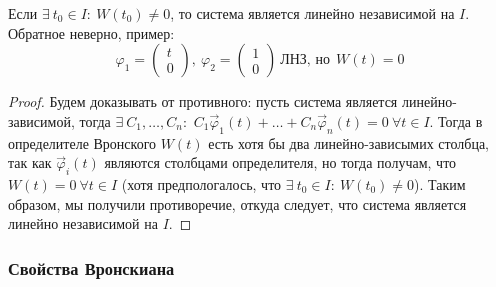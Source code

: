     \begin{theorem}
        Если $\exists ~ t_0 \in I : ~ W(t_0) \neq 0$, то система является линейно независимой на $I$. Обратное неверно,
        пример:
        \begin{equation*}
            \varphi_1 = 
            \begin{pmatrix}
                t \\
                0
            \end{pmatrix}, ~
            \varphi_2 = 
            \begin{pmatrix}
                1 \\
                0
            \end{pmatrix} ~ \text{ЛНЗ, но} ~~ W(t) = 0
        \end{equation*}
    \end{theorem}

    \begin{proof}
        Будем доказывать от противного: пусть система является линейно-зависимой, тогда $\exists ~ C_1, \dots, C_n:$
        $C_1 \vec \varphi_1(t) + \dots + C_n \vec \varphi_n(t) = 0 ~ \forall t \in I$. Тогда в определителе Вронского $W(t)$
        есть хотя бы два линейно-зависымих столбца, так как $\vec \varphi_i(t)$ являются столбцами определителя, но тогда получам, что
        $W(t) = 0 ~ \forall t \in I$ (хотя предпологалось, что $\exists ~ t_0 \in I : ~ W(t_0) \neq 0$). Таким образом, мы получили противоречие,
        откуда следует, что система является линейно независимой на $I$.
    \end{proof}

    \subsubsection*{Свойства Вронскиана}

